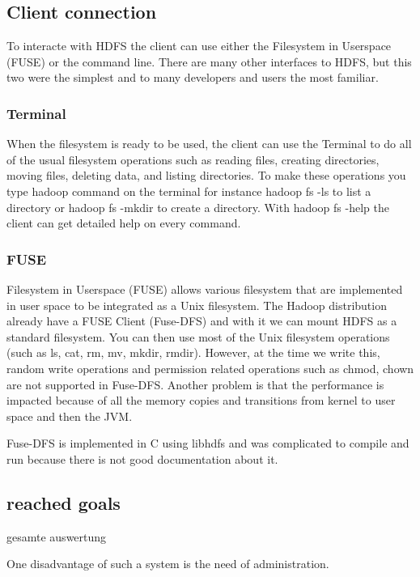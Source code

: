 \subsection{Client connection}

To interacte with HDFS the client can use either the Filesystem in Userspace (FUSE) or the command line. There are many other interfaces to HDFS, but this two were the simplest and to many developers and users the most familiar.

\label{sec:hdfs_client}

\subsubsection{Terminal}

When the filesystem is ready to be used, the client can use the Terminal to do all of the usual filesystem operations such as reading files, creating directories, moving files, deleting data, and listing directories. To make these operations you type hadoop command on the terminal for instance hadoop fs -ls to list a directory or hadoop fs -mkdir to create a directory. With hadoop fs -help the client can get detailed help on every command.

\subsubsection{FUSE}

Filesystem in Userspace (FUSE) allows various filesystem that are implemented in user space to be integrated as a Unix filesystem. The Hadoop distribution already have a FUSE Client (Fuse-DFS) and with it we can mount HDFS as a standard filesystem. You can then use most of the Unix filesystem operations (such as ls, cat, rm, mv, mkdir, rmdir). However, at the time we write this, random write operations and permission related operations such as chmod, chown are not supported in Fuse-DFS. Another problem is that the performance is impacted because of all the memory copies and transitions from kernel to user space and then the JVM.

Fuse-DFS is implemented in C using libhdfs and was complicated to compile and run because there is not good documentation about it.

\subsection{reached goals}

gesamte auswertung


One disadvantage of such a system is the need of administration.


